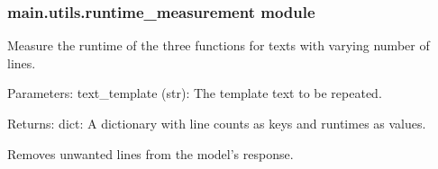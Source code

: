 \documentclass[letterpaper,10pt,english]{sphinxmanual}
\begin{document}
\subsubsection{main.utils.runtime\_measurement module}
\label{\detokenize{main.utils:module-main.utils.runtime_measurement}}\label{\detokenize{main.utils:main-utils-runtime-measurement-module}}

\begin{fulllineitems}
\label{\detokenize{main.utils:main.utils.runtime_measurement.measure_runtimes_for_different_lines}}
\pysigstartsignatures
{}
\pysigstopsignatures
\sphinxAtStartPar
Measure the runtime of the three functions for texts with varying number of lines.

\sphinxAtStartPar
Parameters:
\sphinxhyphen{} text\_template (str): The template text to be repeated.

\sphinxAtStartPar
Returns:
\sphinxhyphen{} dict: A dictionary with line counts as keys and runtimes as values.

\end{fulllineitems}


\begin{fulllineitems}
\label{\detokenize{main.utils:main.utils.runtime_measurement.remove_unwanted_line}}
\pysigstartsignatures
{}
\pysigstopsignatures
\sphinxAtStartPar
Removes unwanted lines from the model’s response.

\end{fulllineitems}
\end{document}

